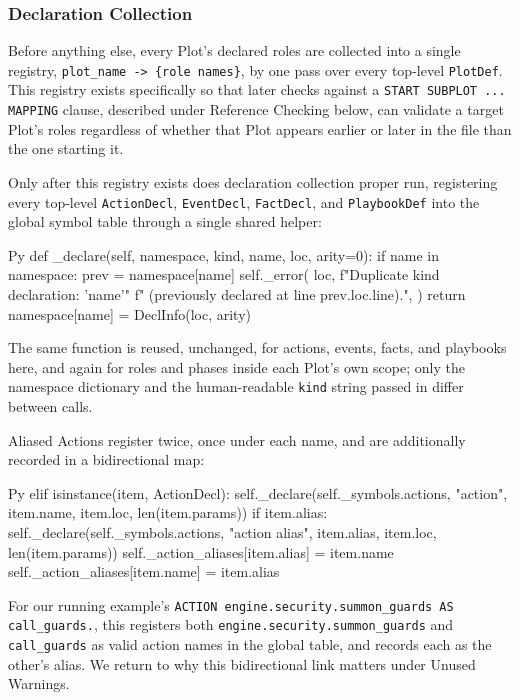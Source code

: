 \subsubsection{Declaration Collection}
Before anything else, every Plot's declared roles are collected into a single registry, \lstinline|plot_name -> {role names}|, by one pass over every top-level \lstinline|PlotDef|. This registry exists specifically so that later checks against a \lstinline|START SUBPLOT ... MAPPING| clause, described under Reference Checking below, can validate a target Plot's roles regardless of whether that Plot appears earlier or later in the file than the one starting it.

Only after this registry exists does declaration collection proper run, registering every top-level \lstinline|ActionDecl|, \lstinline|EventDecl|, \lstinline|FactDecl|, and \lstinline|PlaybookDef| into the global symbol table through a single shared helper:
\begin{codeblock}[]{Py}
def _declare(self, namespace, kind, name, loc, arity=0):
    if name in namespace:
        prev = namespace[name]
        self._error(
            loc,
            f"Duplicate {kind} declaration: '{name}'"
            f" (previously declared at line {prev.loc.line}).",
        )
        return
    namespace[name] = DeclInfo(loc, arity)
\end{codeblock}
The same function is reused, unchanged, for actions, events, facts, and playbooks here, and again for roles and phases inside each Plot's own scope; only the namespace dictionary and the human-readable \lstinline|kind| string passed in differ between calls.

Aliased Actions register twice, once under each name, and are additionally recorded in a bidirectional map:
\begin{codeblock}[]{Py}
elif isinstance(item, ActionDecl):
    self._declare(self._symbols.actions, "action", item.name, item.loc, len(item.params))
    if item.alias:
        self._declare(self._symbols.actions, "action alias", item.alias, item.loc, len(item.params))
        self._action_aliases[item.alias] = item.name
        self._action_aliases[item.name] = item.alias
\end{codeblock}
For our running example's \lstinline|ACTION engine.security.summon_guards AS call_guards.|, this registers both \lstinline|engine.security.summon_guards| and \lstinline|call_guards| as valid action names in the global table, and records each as the other's alias. We return to why this bidirectional link matters under Unused Warnings.

